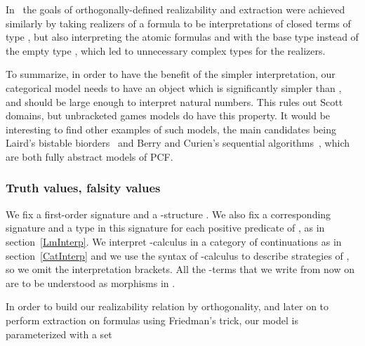 \documentclass{CSML}
\begin{document}
In~\cite{BlotRibaBarRec} the goals of orthogonally-defined realizability and extraction were achieved similarly by taking realizers of a formula  to be interpretations of closed terms of type , but also interpreting the atomic formulas and  with the base type  instead of the empty type , which led to unnecessary complex types for the realizers.\par
To summarize, in order to have the benefit of the simpler interpretation, our categorical model  needs to have an object  which is significantly simpler than , and  should be large enough to interpret natural numbers. This rules out Scott domains, but unbracketed games models do have this property. It would be interesting to find other examples of such models, the main candidates being Laird's bistable biorders~\cite{LairdBistable} and Berry and Curien's sequential algorithms~\cite{BerryCurienSequential}, which are both fully abstract models of PCF.
\subsubsection{Truth values, falsity values}
\label{OrthoReal}
We fix a first-order signature  and a -structure . We also fix a corresponding  signature and a type  in this signature for each positive predicate  of , as in section~\ref{LmInterp}. We interpret -calculus in a category of continuations  as in section~\ref{CatInterp} and we use the syntax of -calculus to describe strategies of , so we omit the interpretation brackets. All the -terms that we write from now on are to be understood as morphisms in .\par
In order to build our realizability relation by orthogonality, and later on to perform extraction on  formulas using Friedman's trick, our model is parameterized with a set
\end{document}
